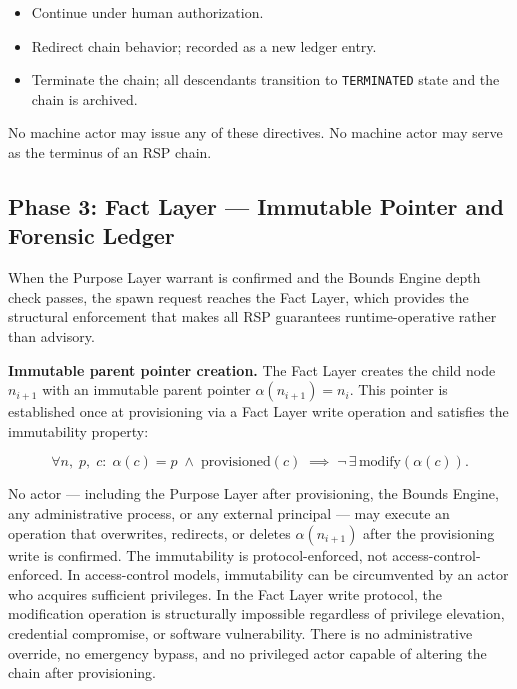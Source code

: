 \begin{itemize}
    \item[\texttt{ACK}] Continue under human authorization.
    \item[\texttt{RESOLVE}] Redirect chain behavior; recorded as a new ledger entry.
    \item[\texttt{REJECT}] Terminate the chain; all descendants transition to \texttt{TERMINATED} state and the chain is archived.
\end{itemize}

No machine actor may issue any of these directives. No machine actor may serve as the terminus of an RSP chain.

\subsection{Phase 3: Fact Layer — Immutable Pointer and Forensic Ledger}

When the Purpose Layer warrant is confirmed and the Bounds Engine depth check passes, the spawn request reaches the Fact Layer, which provides the structural enforcement that makes all RSP guarantees runtime-operative rather than advisory.

\medskip
\noindent\textbf{Immutable parent pointer creation.} The Fact Layer creates the child node $n_{i+1}$ with an immutable parent pointer $\alpha(n_{i+1}) = n_i$. This pointer is established once at provisioning via a Fact Layer write operation and satisfies the immutability property:

\begin{equation}
\forall n,\; p,\; c:\;
\alpha(c) = p \;\land\; \text{provisioned}(c)
\; \implies\;
\neg\,\exists\,\text{modify}(\alpha(c)).
\label{eq:rs-pointer-immutability}
\end{equation}

No actor — including the Purpose Layer after provisioning, the Bounds Engine, any administrative process, or any external principal — may execute an operation that overwrites, redirects, or deletes $\alpha(n_{i+1})$ after the provisioning write is confirmed. The immutability is protocol-enforced, not access-control-enforced. In access-control models, immutability can be circumvented by an actor who acquires sufficient privileges. In the Fact Layer write protocol, the modification operation is structurally impossible regardless of privilege elevation, credential compromise, or software vulnerability. There is no administrative override, no emergency bypass, and no privileged actor capable of altering the chain after provisioning.


